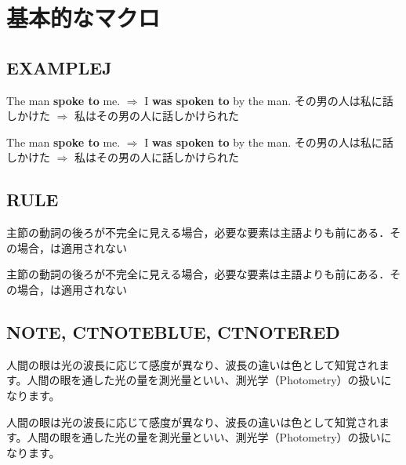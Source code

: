 \documentclass[../main]{subfiles}
\begin{document}
\setcounter{section}{1}
\section{基本的なマクロ}
\subsection{EXAMPLEJ}
\EXAMPLEJ
    {The man \textbf{spoke to} me. $\Rightarrow$ I \textbf{was spoken to} by the man.}
    {その男の人は私に話しかけた $\Rightarrow$ 私はその男の人に話しかけられた}
\begin{code}[language=tex]
\EXAMPLEJ
    {The man \textbf{spoke to} me. $\Rightarrow$ I \textbf{was spoken to} by the man.}
    {その男の人は私に話しかけた $\Rightarrow$ 私はその男の人に話しかけられた}
\end{code}

\leaderfill

\subsection{RULE}
\begin{RULE}
    主節の動詞の後ろが不完全に見える場合，必要な要素は主語よりも前にある．その場合，は適用されない
\end{RULE}
\begin{code}[language=tex]
\begin{RULE}
    主節の動詞の後ろが不完全に見える場合，必要な要素は主語よりも前にある．その場合，は適用されない
\end{RULE}
\end{code}

\leaderfill

\subsection{NOTE, CTNOTEBLUE, CTNOTERED}
\begin{NOTE}
    人間の眼は光の波長に応じて感度が異なり、波長の違いは色として知覚されます。人間の眼を通した光の量を測光量といい、測光学（Photometry）の扱いになります。
\end{NOTE}
\begin{code}[language=tex]
\begin{NOTE}
    人間の眼は光の波長に応じて感度が異なり、波長の違いは色として知覚されます。人間の眼を通した光の量を測光量といい、測光学（Photometry）の扱いになります。
\end{NOTE}
\end{code}
\end{document}
